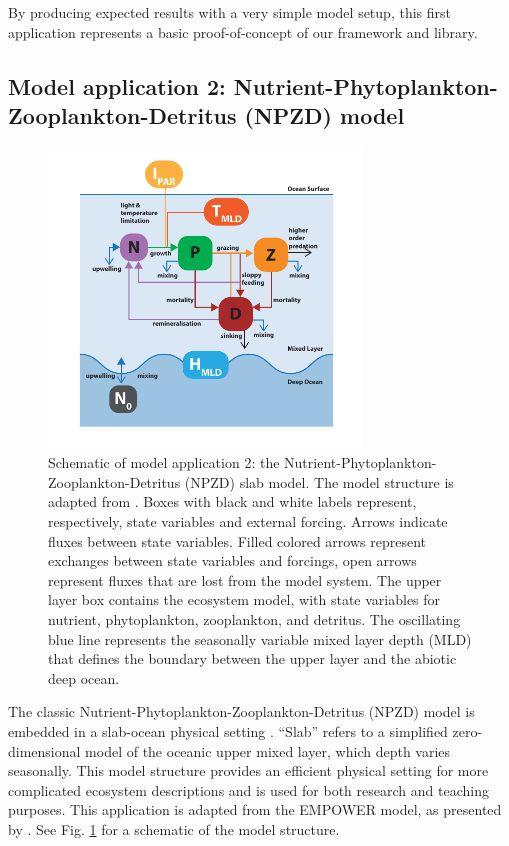 \documentclass[gmd, manuscript]{copernicus}
\begin{document}
By producing expected results with a very simple model setup, this first application represents a basic proof-of-concept of our framework and library.




\subsection{Model application 2: Nutrient-Phytoplankton-Zooplankton-Detritus (NPZD) model}
\begin{figure}[t]
\includegraphics[width=8.3cm]{Figures/firstdraft_schematics/02_schematics_EMPOWER.pdf}
\caption{Schematic of model application 2: the Nutrient-Phytoplankton-Zooplankton-Detritus (NPZD) slab model. The model structure is adapted from \citet{Anderson2015c}. Boxes with black and white labels represent, respectively, state variables and external forcing. Arrows indicate fluxes between state variables. Filled colored arrows represent exchanges between state variables and forcings, open arrows represent fluxes that are lost from the model system. The upper layer box contains the ecosystem model, with state variables for nutrient, phytoplankton, zooplankton, and detritus. The oscillating blue line represents the seasonally variable mixed layer depth (MLD) that defines the boundary between the upper layer and the abiotic deep ocean.}
\label{Figure:ModelSchematics_2}
\end{figure}

The classic Nutrient-Phytoplankton-Zooplankton-Detritus (NPZD) model is embedded in a slab-ocean physical setting \citep[e.g.,][]{Evans1985ACycles, Fasham1990a}. “Slab” refers to a simplified zero-dimensional model of the oceanic upper mixed layer, which depth varies seasonally. This model structure provides an efficient physical setting for more complicated ecosystem descriptions and is used for both research and teaching purposes. This application is adapted from the EMPOWER model, as presented by \citet{Anderson2015c}. See Fig. \ref{Figure:ModelSchematics_2} for a schematic of the model structure.
\end{document}
